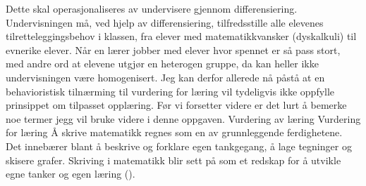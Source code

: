 \documentclass[main.tex]{subfiles}
\begin{document}
Dette skal operasjonaliseres av undervisere gjennom differensiering.  Undervisningen må, ved hjelp av differensiering, 
tilfredsstille alle elevenes tilretteleggingsbehov i klassen, fra elever med matematikkvansker (dyskalkuli) til evnerike elever. Når en lærer jobber 
med elever hvor spennet er så pass stort, med andre ord at elevene utgjør en heterogen gruppe, da kan heller ikke undervisningen 
være homogenisert. Jeg kan derfor allerede nå påstå at en behavioristisk tilnærming til vurdering for læring vil tydeligvis ikke oppfylle prinsippet om tilpasset opplæring.
\newline
\newline
Før vi forsetter videre er det lurt å bemerke noe termer jegg vil bruke videre i denne oppgaven.
Vurdering av læring
Vurdering for læring
\newline
\newline
Å skrive matematikk regnes som en av grunnleggende ferdighetene. Det innebærer blant å beskrive og forklare 
egen tankgegang, å lage tegninger og skisere grafer. Skriving i matematikk blir sett på som et redskap for å 
utvikle egne tanker og egen læring (\citeNP{udirGF]}).
\end{document}
